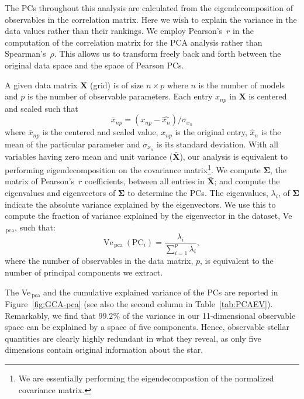 The PCs throughout this analysis are calculated from the eigendecomposition of observables in the correlation matrix. Here we wish to explain the variance in the data values rather than their rankings. 
 We employ Pearson's~$r$ in the computation of the correlation matrix for the PCA analysis rather than Spearman's~$\rho$. This allows us to transform freely back and forth between the original data space and the space of Pearson PCs.  
 
A given data matrix $\mathbf{X}$ (grid) is of size ${n \times p}$ where $n$ is the number of models  and $p$ is the number of observable parameters. 
Each entry $x_{np}$ in $\mathbf{X}$ is centered and scaled such that 
\begin{equation}
\bar{x}_{np} = (x_{np} -\hat{x_n})/\sigma_{x_n}
\end{equation}
where $\bar{x}_{np}$ is the centered and scaled value,  $x_{np}$ is the original entry, $\hat{x}_n$ is the mean of the particular parameter and $\sigma_{x_n}$ is its standard deviation. 
With all variables having zero mean and unit variance ($\mathbf{\bar{X}}$), our analysis is equivalent to performing eigendecomposition on the covariance matrix\footnote{We are essentially performing the eigendecompostion of the normalized covariance matrix.}. 
We compute $\boldsymbol\Sigma$, the matrix of Pearson's~$r$  coefficients, between all entries in $\mathbf{\bar{X}}$; and compute the eigenvalues and eigenvectors of $\boldsymbol\Sigma$ to determine the PCs.
The eigenvalues, $\lambda_i$, of $\boldsymbol\Sigma$ indicate the absolute variance explained by the eigenvectors. We use this to compute the fraction of variance explained by the eigenvector in the dataset, Ve$_{\, \text{pca}}$, such that:
\begin{equation}
\text{Ve}_{\, \text{pca}} \ (\text{PC}_i)=\frac{\lambda_i}{\sum_{i=1}^p \lambda_i}, 
\label{eqn:pcaev}
\end{equation}
where the number of observables in the data matrix, $p$, is equivalent to the number of principal components we extract.




The Ve$_{\,\text{pca}}$ and the cumulative explained variance of the PCs are reported in Figure~\ref{fig:GCA-pca} (see also the second column in Table~\ref{tab:PCAEV}).
Remarkably, we find that $99.2\%$ of the variance in our 11-dimensional observable space can be explained by a space of five components.
Hence, observable stellar quantities are clearly highly redundant in what they reveal, as only five dimensions contain original information about the star. 


